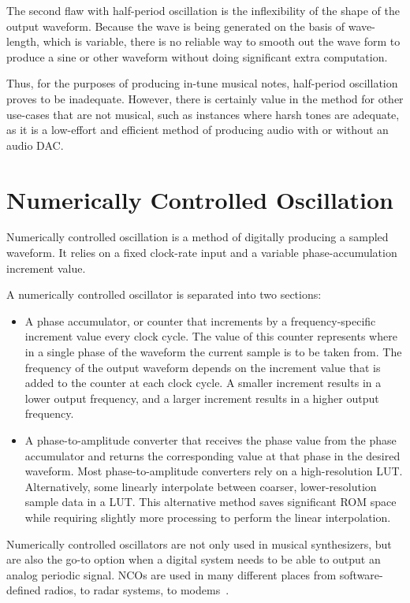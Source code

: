 \documentclass[conference]{IEEEtran}
\begin{document}
The second flaw with half-period oscillation is the inflexibility of the shape of the output waveform. Because the wave is being generated on the basis of wave-length, which is variable, there is no reliable way to smooth out the wave form to produce a sine or other waveform without doing significant extra computation. 

Thus, for the purposes of producing in-tune musical notes, half-period oscillation proves to be inadequate. However, there is certainly value in the method for other use-cases that are not musical, such as instances where harsh tones are adequate, as it is a low-effort and efficient method of producing audio with or without an audio DAC. 

\section{Numerically Controlled Oscillation}
Numerically controlled oscillation is a method of digitally producing a sampled waveform. It relies on a fixed clock-rate input and a variable phase-accumulation increment value.

A numerically controlled oscillator is separated into two sections:
\begin{itemize}
\item A phase accumulator, or counter that increments by a frequency-specific increment value every clock cycle. The value of this counter represents where in a single phase of the waveform the current sample is to be taken from. The frequency of the output waveform depends on the increment value that is added to the counter at each clock cycle. A smaller increment results in a lower output frequency, and a larger increment results in a higher output frequency.
\item A phase-to-amplitude converter that receives the phase value from the phase accumulator and returns the corresponding value at that phase in the desired waveform. Most phase-to-amplitude converters rely on a high-resolution LUT. Alternatively, some linearly interpolate between coarser, lower-resolution sample data in a LUT.
This alternative method saves significant ROM space while requiring slightly more processing to perform the linear interpolation.
\end{itemize}
Numerically controlled oscillators are not only used in musical synthesizers, but are also the go-to option when a digital system needs to be able to output an analog periodic signal. NCOs are used in many different places from software-defined radios, to radar systems, to modems~\cite{latticesemi_nco}.
\end{document}
